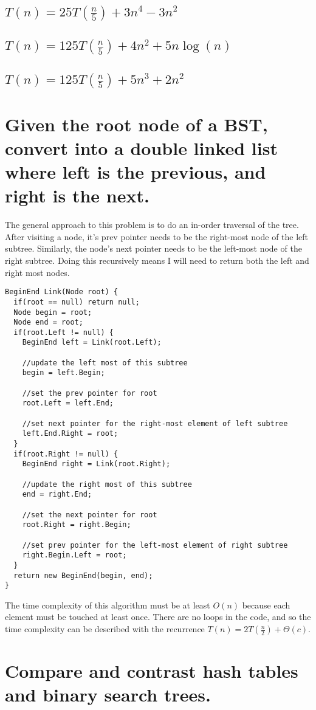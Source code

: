 \documentclass{article}
\begin{document}
    \subsection{\(T(n) = 25T(\frac{n}{5}) + 3n^4 - 3n^2\)}
    \subsection{\(T(n) = 125T(\frac{n}{5}) + 4n^2 + 5n \log(n)\)}
    \subsection{\(T(n) = 125T(\frac{n}{5}) + 5n^3 + 2n^2\)}

\section{Given the root node of a BST, convert into a double linked list where left is the previous, and right is the next.}
The general approach to this problem is to do an in-order traversal of the tree.
After visiting a node, it's prev pointer needs to be the right-most node of the left subtree.
Similarly, the node's next pointer needs to be the left-most node of the right subtree.
Doing this recursively means I will need to return both the left and right most nodes.
\begin{lstlisting}
BeginEnd Link(Node root) {
  if(root == null) return null;
  Node begin = root;
  Node end = root;
  if(root.Left != null) {
    BeginEnd left = Link(root.Left);

    //update the left most of this subtree
    begin = left.Begin; 

    //set the prev pointer for root
    root.Left = left.End; 

    //set next pointer for the right-most element of left subtree
    left.End.Right = root; 
  }
  if(root.Right != null) {
    BeginEnd right = Link(root.Right);

    //update the right most of this subtree
    end = right.End;

    //set the next pointer for root
    root.Right = right.Begin;

    //set prev pointer for the left-most element of right subtree
    right.Begin.Left = root;
  }
  return new BeginEnd(begin, end);
}
\end{lstlisting}
The time complexity of this algorithm must be at least \(O(n)\) because each element must be touched at least once.
There are no loops in the code, and so the time complexity can be described with the recurrence \(T(n) = 2T(\frac{n}{2}) + \Theta(c)\).

\section{Compare and contrast hash tables and binary search trees.}
\end{document}

